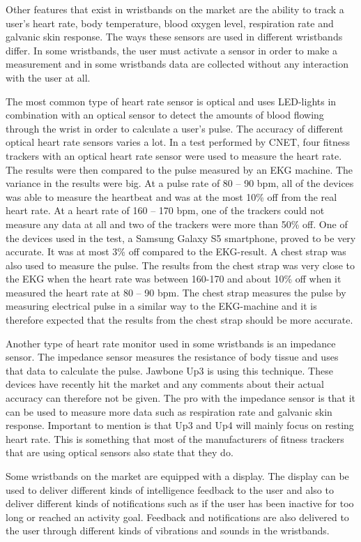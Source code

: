 \documentclass{cslthse-msc}
\begin{document}
Other features that exist in wristbands on the market are the ability to track a user's heart rate, body temperature, blood oxygen level, respiration rate and galvanic skin response. The ways these sensors are used in different wristbands differ. In some wristbands, the user must activate a sensor in order to make a measurement and in some wristbands data are collected without any interaction with the user at all.

The most common type of heart rate sensor is optical and uses LED-lights in combination with an optical sensor to detect the amounts of blood flowing through the wrist in order to calculate a user’s pulse. The accuracy of different optical heart rate sensors varies a lot. In a test performed by CNET, four fitness trackers with an optical heart rate sensor were used to measure the heart rate. The results were then compared to the pulse measured by an EKG machine. The variance in the results were big.  At a pulse rate of 80 – 90 bpm, all of the devices was able to measure the heartbeat and was at the most 10\% off from the real heart rate. At a heart rate of 160 – 170 bpm, one of the trackers could not measure any data at all and two of the trackers were more than 50\% off\cite{CNET}. One of the devices used in the test, a Samsung Galaxy S5 smartphone, proved to be very accurate. It was at most 3\% off compared to the EKG-result. A chest strap was also used to measure the pulse. The results from the chest strap was very close to the EKG when the heart rate was between 160-170 and about 10\% off when it measured the heart rate at 80 – 90 bpm. The chest strap measures the pulse by measuring electrical pulse in a similar way to the EKG-machine and it is therefore expected that the results from the chest strap should be more accurate. 

Another type of heart rate monitor used in some wristbands is an impedance sensor. The impedance sensor measures the resistance of body tissue and uses that data to calculate the pulse. Jawbone Up3 is using this technique\cite{up3}. These devices have recently hit the market and any comments about their actual accuracy can therefore not be given. The pro with the impedance sensor is that it can be used to measure more data such as respiration rate and galvanic skin response. Important to mention is that Up3 and Up4 will mainly focus on resting heart rate. This is something that most of the manufacturers of fitness trackers that are using optical sensors also state that they do. 

Some wristbands on the market are equipped with a display. The display can be used to deliver different kinds of intelligence feedback to the user and also to deliver different kinds of notifications such as if the user has been inactive for too long or reached an activity goal.  Feedback and notifications are also delivered to the user through different kinds of vibrations and sounds in the wristbands. 
\end{document}
